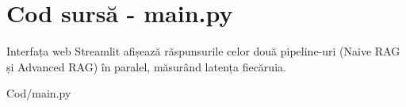 \chapter{Cod sursă - main.py}
\label{anexa:main}

Interfața web Streamlit afișează răspunsurile celor două pipeline-uri
(Naive RAG și Advanced RAG) în paralel, măsurând latența fiecăruia.


  {Cod/main.py}
